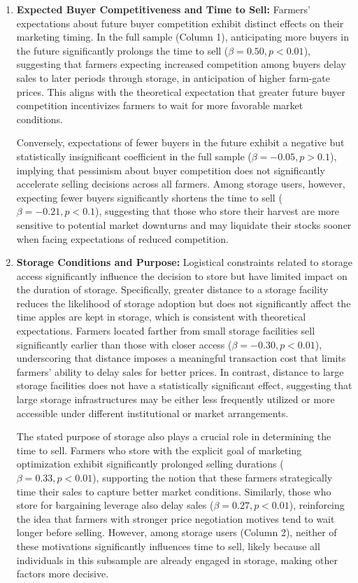 \begin{enumerate}
    \item \textbf{Expected Buyer Competitiveness and Time to Sell:} Farmers' expectations about future buyer competition exhibit distinct effects on their marketing timing. In the full sample (Column 1), anticipating more buyers in the future significantly prolongs the time to sell ($\beta = 0.50, p<0.01$), suggesting that farmers expecting increased competition among buyers delay sales to later periods through storage, in anticipation of higher farm-gate prices. This aligns with the theoretical expectation that greater future buyer competition incentivizes farmers to wait for more favorable market conditions.
    
    Conversely, expectations of fewer buyers in the future exhibit a negative but statistically insignificant coefficient in the full sample ($\beta = -0.05, p>0.1$), implying that pessimism about buyer competition does not significantly accelerate selling decisions across all farmers. Among storage users, however, expecting fewer buyers significantly shortens the time to sell ($\beta = -0.21, p<0.1$), suggesting that those who store their harvest are more sensitive to potential market downturns and may liquidate their stocks sooner when facing expectations of reduced competition.
    
    \item \textbf{Storage Conditions and Purpose:} 
    Logistical constraints related to storage access significantly influence the decision to store but have limited impact on the duration of storage. Specifically, greater distance to a storage facility reduces the likelihood of storage adoption but does not significantly affect the time apples are kept in storage, which is consistent with theoretical expectations. Farmers located farther from small storage facilities sell significantly earlier than those with closer access ($\beta = -0.30, p<0.01$), underscoring that distance imposes a meaningful transaction cost that limits farmers' ability to delay sales for better prices. In contrast, distance to large storage facilities does not have a statistically significant effect, suggesting that large storage infrastructures may be either less frequently utilized or more accessible under different institutional or market arrangements.
    
    The stated purpose of storage also plays a crucial role in determining the time to sell. Farmers who store with the explicit goal of marketing optimization exhibit significantly prolonged selling durations ($\beta = 0.33, p<0.01$), supporting the notion that these farmers strategically time their sales to capture better market conditions. Similarly, those who store for bargaining leverage also delay sales ($\beta = 0.27, p<0.01$), reinforcing the idea that farmers with stronger price negotiation motives tend to wait longer before selling. However, among storage users (Column 2), neither of these motivations significantly influences time to sell, likely because all individuals in this subsample are already engaged in storage, making other factors more decisive.
    

\end{enumerate}

